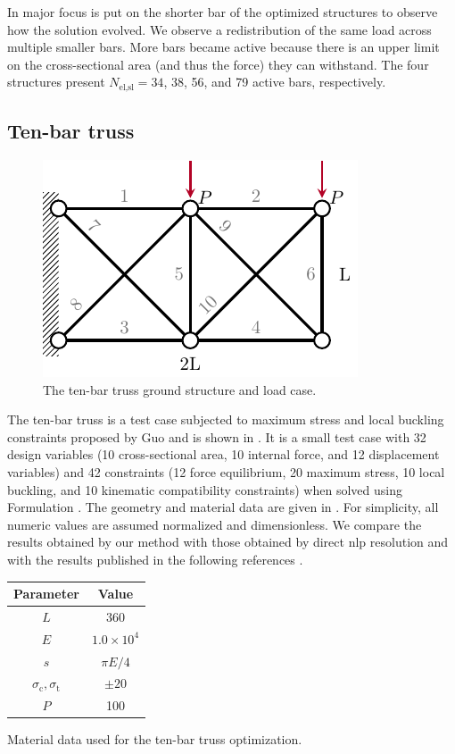 In  major focus is put on the shorter bar of the optimized structures to observe how the solution evolved. We observe a redistribution of the same load across multiple smaller bars. More bars became active because there is an upper limit on the cross-sectional area (and thus the force) they can withstand. The four structures present $N_\text{el,sl}=34$, 38, 56, and 79 active bars, respectively.

\subsection{Ten-bar truss}
\label{sec:04_10bar}
 \begin{figure}
    \centering
    \includegraphics{figures/04_TTO_improvements/08_10_bar/10_bar_BC.pdf}
    \caption{The ten-bar truss ground structure and load case.}
    \label{fig:04_10-bar-bcs}
\end{figure}
The ten-bar truss is a test case subjected to maximum stress and local buckling constraints proposed by Guo \etal \cite{guo_new_2001} and is shown in . It is a small test case with 32 design variables (10 cross-sectional area, 10 internal force, and 12 displacement variables) and 42 constraints (12 force equilibrium, 20 maximum stress, 10 local buckling, and 10 kinematic compatibility constraints) when solved using Formulation . The geometry and material data are given in . For simplicity, all numeric values are assumed normalized and dimensionless. We compare the results obtained by our method with those obtained by direct \gls{nlp} resolution and with the results published in the following references . 

\begin{margintable}
    \small
    \centering
    \begin{tabular}{cc}
    \toprule
    \textbf{Parameter}        & \textbf{Value} \\ \midrule
    $L$ & 360 \\
    $E$              & $1.0 \times 10^{4}$     \\
    $s$ & $\pi E/4$ \\
    $\sigma_\text{c}, \sigma_\text{t}$ & $\pm 20$ \\
    $P$              & 100   \\
    \bottomrule
    \end{tabular}
    \caption{Material data used for the ten-bar truss optimization.}
    \label{tab:04_10-bar_mat}
\end{margintable}


